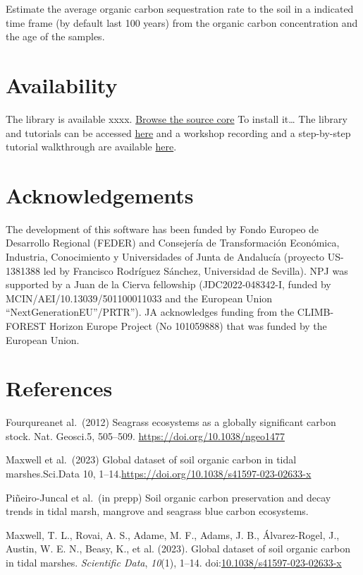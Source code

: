 \documentclass[10pt,a4paper,onecolumn]{article}
\newlength{\cslhangindent}
\newlength{\cslentryspacingunit} %
\newenvironment{CSLReferences}[2] %
 {%
  \setlength{\parindent}{0pt}
  \ifodd #1
  \let\oldpar\par
  \def\par{\hangindent=\cslhangindent\oldpar}
  \fi
  \setlength{\parskip}{#2\cslentryspacingunit}
 }%
 {}
\begin{document}
Estimate the average organic carbon sequestration rate to the soil in a
indicated time frame (by default last 100 years) from the organic carbon
concentration and the age of the samples.

\hypertarget{availability}{%
\section{Availability}\label{availability}}

The library is available xxxx.
\href{https://github.com/EcologyR/BlueCarbon/}{Browse the source core}
To install it\ldots{} The library and tutorials can be accessed
\href{https://ecologyr.github.io/BlueCarbon/}{here} and a workshop
recording and a step-by-step tutorial walkthrough are available
\href{https://www.youtube.com/watch?v=XCrrR3_MSHc\&ab_channel=EcoinformaticaAEET}{here}.

\hypertarget{acknowledgements}{%
\section{Acknowledgements}\label{acknowledgements}}

The development of this software has been funded by Fondo Europeo de
Desarrollo Regional (FEDER) and Consejería de Transformación Económica,
Industria, Conocimiento y Universidades of Junta de Andalucía (proyecto
US-1381388 led by Francisco Rodríguez Sánchez, Universidad de Sevilla).
NPJ was supported by a Juan de la Cierva fellowship (JDC2022-048342-I,
funded by MCIN/AEI/10.13039/501100011033 and the European Union
``NextGenerationEU''/PRTR''). JA acknowledges funding from the
CLIMB-FOREST Horizon Europe Project (No 101059888) that was funded by
the European Union.

\hypertarget{references}{%
\section{References}\label{references}}

Fourqureanet al.~(2012) Seagrass ecosystems as a globally significant
carbon stock. Nat. Geosci.5, 505--509.
\url{https://doi.org/10.1038/ngeo1477}

Maxwell et al.~(2023) Global dataset of soil organic carbon in tidal
marshes.Sci.Data 10,
1--14.\url{https://doi.org/10.1038/s41597-023-02633-x}

Piñeiro-Juncal et al.~(in prepp) Soil organic carbon preservation and
decay trends in tidal marsh, mangrove and seagrass blue carbon
ecosystems.

\hypertarget{refs}{}
\begin{CSLReferences}{1}{0}
\leavevmode{}%
Maxwell, T. L., Rovai, A. S., Adame, M. F., Adams, J. B., Álvarez-Rogel,
J., Austin, W. E. N., Beasy, K., et al. (2023). Global dataset of soil
organic carbon in tidal marshes. \emph{Scientific Data}, \emph{10}(1),
1--14.
doi:\href{https://doi.org/10.1038/s41597-023-02633-x}{10.1038/s41597-023-02633-x}

\end{CSLReferences}
\end{document}
